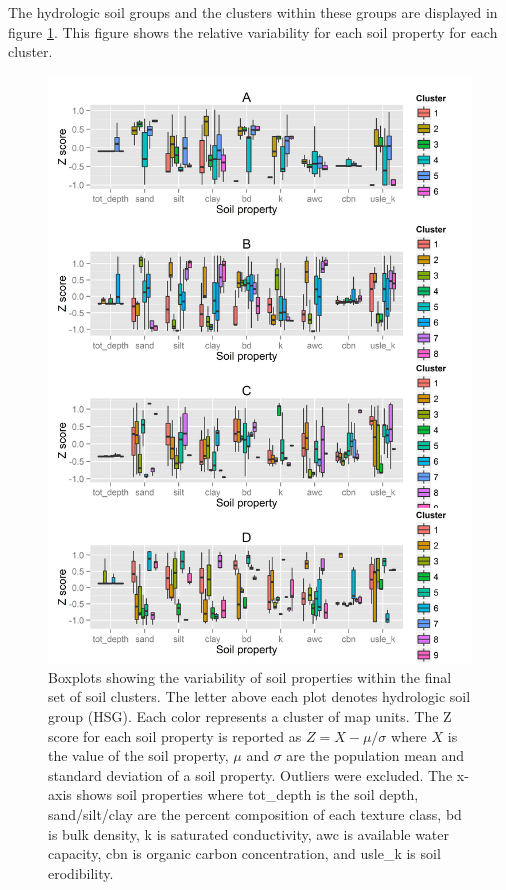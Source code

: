 The hydrologic soil groups and the clusters within these groups are displayed in figure \ref{fig:soil_boxplots}. This figure shows the relative variability for each soil property for each cluster.
 
\begin{figure}[H]
  \centering
    \includegraphics[width=\textwidth]{./img/cluster_variability.png}
	\caption[Boxplots showing the variability of soil properties]{Boxplots showing the variability of soil properties within the final set of soil clusters. The letter above each plot denotes hydrologic soil group (HSG). Each color represents a cluster of map units. The Z score for each soil property is reported as $Z = X - \mu / \sigma$ where $X$ is the value of the soil property, $\mu$ and $\sigma$ are the population mean and standard deviation of a soil property. Outliers were excluded. The x-axis shows soil properties where tot\_depth is the soil depth, sand/silt/clay are the percent composition of each texture class, bd is bulk density, k is saturated conductivity, awc is available water capacity, cbn is organic carbon concentration, and usle\_k is soil erodibility.}
	\label{fig:soil_boxplots}
\end{figure}

